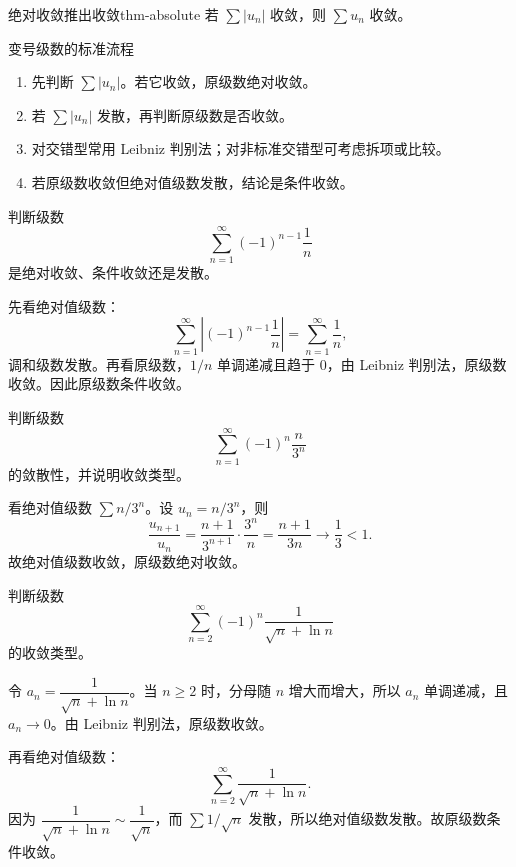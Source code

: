 \begin{dl}{绝对收敛推出收敛}{thm-absolute}
若 $\sum |u_n|$ 收敛，则 $\sum u_n$ 收敛。
\end{dl}

\begin{methodbox}{变号级数的标准流程}
\begin{enumerate}
  \item 先判断 $\sum |u_n|$。若它收敛，原级数绝对收敛。
  \item 若 $\sum |u_n|$ 发散，再判断原级数是否收敛。
  \item 对交错型常用 Leibniz 判别法；对非标准交错型可考虑拆项或比较。
  \item 若原级数收敛但绝对值级数发散，结论是条件收敛。
\end{enumerate}
\end{methodbox}

\begin{problem}
判断级数
\[
  \sum_{n=1}^{\infty}(-1)^{n-1}\frac1n
\]
是绝对收敛、条件收敛还是发散。
\end{problem}
\begin{solution}
先看绝对值级数：
\[
  \sum_{n=1}^{\infty}\left|(-1)^{n-1}\frac1n\right|=\sum_{n=1}^{\infty}\frac1n,
\]
调和级数发散。再看原级数，$1/n$ 单调递减且趋于 $0$，由 Leibniz 判别法，原级数收敛。因此原级数条件收敛。
\end{solution}

\begin{problem}
判断级数
\[
  \sum_{n=1}^{\infty}(-1)^n\frac{n}{3^n}
\]
的敛散性，并说明收敛类型。
\end{problem}
\begin{solution}
看绝对值级数 $\sum n/3^n$。设 $u_n=n/3^n$，则
\[
  \frac{u_{n+1}}{u_n}
  =\frac{n+1}{3^{n+1}}\cdot\frac{3^n}{n}
  =\frac{n+1}{3n}\to\frac13<1.
\]
故绝对值级数收敛，原级数绝对收敛。
\end{solution}

\begin{problem}
判断级数
\[
  \sum_{n=2}^{\infty}(-1)^n\frac1{\sqrt n+\ln n}
\]
的收敛类型。
\end{problem}
\begin{solution}
令 $a_n=\dfrac1{\sqrt n+\ln n}$。当 $n\ge2$ 时，分母随 $n$ 增大而增大，所以 $a_n$ 单调递减，且 $a_n\to0$。由 Leibniz 判别法，原级数收敛。

再看绝对值级数：
\[
  \sum_{n=2}^{\infty}\frac1{\sqrt n+\ln n}.
\]
因为 $\dfrac1{\sqrt n+\ln n}\sim\dfrac1{\sqrt n}$，而 $\sum 1/\sqrt n$ 发散，所以绝对值级数发散。故原级数条件收敛。
\end{solution}

